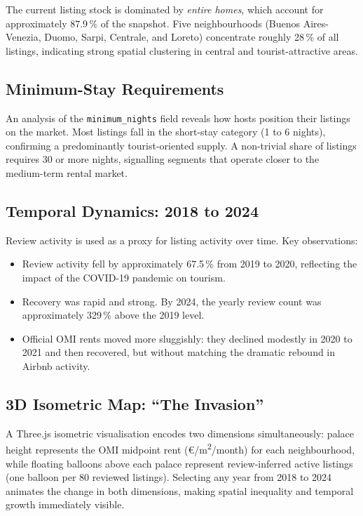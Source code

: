 \documentclass[11pt, a4paper]{article}
\begin{document}
The current listing stock is dominated by \emph{entire homes}, which account for approximately
87.9\,\% of the snapshot. Five neighbourhoods (Buenos Aires-Venezia, Duomo, Sarpi,
Centrale, and Loreto) concentrate roughly 28\,\% of all listings, indicating strong
spatial clustering in central and tourist-attractive areas.

\subsection{Minimum-Stay Requirements}

An analysis of the \texttt{minimum\_nights} field reveals how hosts position their listings
on the market. Most listings fall in the short-stay category (1 to 6 nights), confirming a
predominantly tourist-oriented supply. A non-trivial share of listings requires 30 or more
nights, signalling segments that operate closer to the medium-term rental market.

\subsection{Temporal Dynamics: 2018 to 2024}

Review activity is used as a proxy for listing activity over time. Key observations:

\begin{itemize}[leftmargin=1.4em]
  \item Review activity fell by approximately 67.5\,\% from 2019 to 2020, reflecting the
        impact of the COVID-19 pandemic on tourism.
  \item Recovery was rapid and strong. By 2024, the yearly review count was approximately
        329\,\% above the 2019 level.
  \item Official OMI rents moved more sluggishly: they declined modestly in 2020 to 2021 and
        then recovered, but without matching the dramatic rebound in Airbnb activity.
\end{itemize}

\subsection{3D Isometric Map: ``The Invasion''}

A Three.js isometric visualisation encodes two dimensions simultaneously: palace height
represents the OMI midpoint rent (\euro{}/m\textsuperscript{2}/month) for each neighbourhood,
while floating balloons above each palace represent review-inferred active listings (one balloon
per 80 reviewed listings). Selecting any year from 2018 to 2024 animates the change in both
dimensions, making spatial inequality and temporal growth immediately visible.
\end{document}
